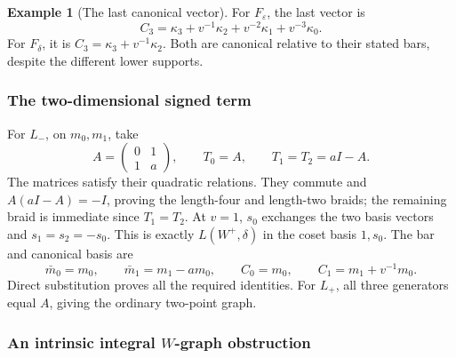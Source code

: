 \documentclass[11pt]{article}
\numberwithin{equation}{section}
\theoremstyle{definition}
\newtheorem{example}[theorem]{Example}
\newcommand{\ee}{\varepsilon}
\newcommand{\dd}{\delta}
\begin{document}
\begin{example}[The last canonical vector]
For \(F_\ee\), the last vector is
\[
 C_3=\kappa_3+v^{-1}\kappa_2+v^{-2}\kappa_1+v^{-3}\kappa_0.
\]
For \(F_\dd\), it is \(C_3=\kappa_3+v^{-1}\kappa_2\).
Both are canonical relative to their stated bars, despite the different lower supports.
\end{example}

\subsubsection{The two-dimensional signed term}

For \(L_-\), on \(m_0,m_1\), take
\begin{equation}
 A=\begin{pmatrix}0&1\\1&a\end{pmatrix},\qquad
 T_0=A,\qquad T_1=T_2=aI-A .
 \label{eq:B3two}
\end{equation}
The matrices satisfy their quadratic relations.
They commute and \(A(aI-A)=-I\), proving the length-four and length-two braids; the remaining braid is immediate since \(T_1=T_2\).
At \(v=1\), \(s_0\) exchanges the two basis vectors and \(s_1=s_2=-s_0\).
This is exactly \(L(W^+,\dd)\) in the coset basis \(1,s_0\).
The bar and canonical basis are
\begin{equation}
 \bar m_0=m_0,\qquad \bar m_1=m_1-am_0,\qquad
 C_0=m_0,\qquad C_1=m_1+v^{-1}m_0 .
 \label{eq:B3twobar}
\end{equation}
Direct substitution proves all the required identities.
For \(L_+\), all three generators equal \(A\), giving the ordinary two-point graph.

\subsubsection{An intrinsic integral \texorpdfstring{\(W\)}{W}-graph obstruction}
\end{document}
